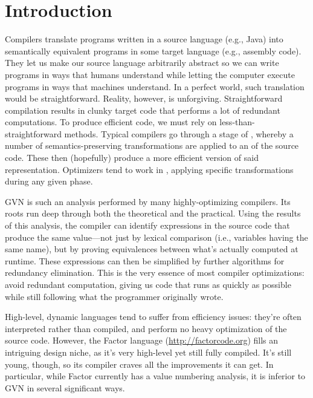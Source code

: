 \section{Introduction}\label{sec:intro}


Compilers translate programs written in a source language (e.g., Java) into
semantically equivalent programs in some target language (e.g., assembly code).
They let us make our source language arbitrarily abstract so we can write
programs in ways that humans understand while letting the computer execute
programs in ways that machines understand.  In a perfect world, such
translation would be straightforward.  Reality, however, is unforgiving.
Straightforward compilation results in clunky target code that performs a lot
of redundant computations.  To produce efficient code, we must rely on
less-than-straightforward methods.  Typical compilers go through a stage of
, whereby a number of semantics-preserving transformations
are applied to an  of the source code.  These then
(hopefully) produce a more efficient version of said representation.
Optimizers tend to work in , applying specific transformations
during any given phase.

\Gls{GVN} is such an analysis performed by many highly-optimizing compilers.
Its roots run deep through both the theoretical and the practical.  Using the
results of this analysis, the compiler can identify expressions in the source
code that produce the same value---not just by lexical comparison (i.e.,
variables having the same name), but by proving equivalences between what's
actually computed at runtime.  These expressions can then be simplified by
further algorithms for redundancy elimination.  This is the very essence of
most compiler optimizations: avoid redundant computation, giving us code that
runs as quickly as possible while still following what the programmer
originally wrote.

High-level, dynamic languages tend to suffer from efficiency issues: they're
often interpreted rather than compiled, and perform no heavy optimization of
the source code.  However, the Factor language (\url{http://factorcode.org})
fills an intriguing design niche, as it's very high-level yet still fully
compiled.  It's still young, though, so its compiler craves all the
improvements it can get.  In particular, while Factor currently has a
 value numbering analysis, it is inferior to \gls{GVN} in several
significant ways.


